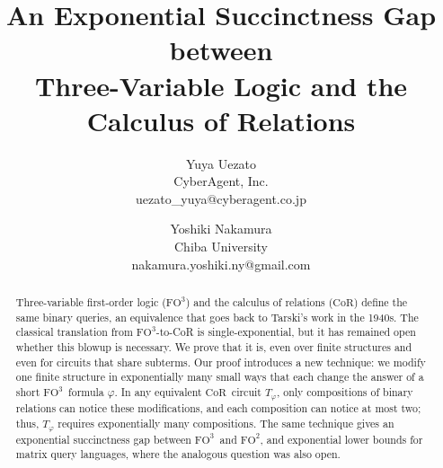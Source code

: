 \documentclass[11pt,letterpaper]{article}
\title{An Exponential Succinctness Gap between\protect\\Three-Variable Logic and the Calculus of Relations}
\author{Yuya Uezato \\
CyberAgent, Inc. \\
uezato\_yuya@cyberagent.co.jp
\and 
Yoshiki Nakamura \\
Chiba University \\
nakamura.yoshiki.ny@gmail.com
}
\date{}
\newif\ifintroproofrefs
\theoremstyle{definition}
\theoremstyle{remark}
\newcommand{\CoR}{\ensuremath{\mathrm{CoR}}}
\newcommand{\FOtwo}{\ensuremath{\mathrm{FO}^{2}}}
\newcommand{\FOthree}{\ensuremath{\mathrm{FO}^{3}}}
\begin{document}
\hypersetup{pageanchor=false}
\begin{titlepage}
\maketitle
\thispagestyle{empty}

\begin{abstract}
Three-variable first-order logic (\FOthree) and the calculus of relations (\CoR)
define the same binary queries, an
equivalence that goes back to Tarski's work in the 1940s. The classical
translation from \FOthree-to-CoR is single-exponential, but it
has remained open whether this blowup is necessary. We prove that it is,
even over finite structures and even for circuits that share subterms. Our proof introduces a new technique: we modify one finite
structure in exponentially many small ways that each change the answer of a short \FOthree\ formula $\varphi$.
In any equivalent \CoR\ circuit $T_\varphi$,
only compositions of binary relations can notice these modifications, and each composition can
notice at most two; thus, $T_\varphi$ requires exponentially many compositions.
The same technique gives an exponential succinctness
gap between \FOthree\ and \FOtwo,
and exponential lower bounds for matrix query languages, where the analogous question was also open.
\end{abstract}
\end{titlepage}
\setcounter{tocdepth}{1}
\tableofcontents\clearpage
\setcounter{page}{1}
\hypersetup{pageanchor=true}



\introproofrefsfalse %







%

\clearpage



\appendix




\end{document}
